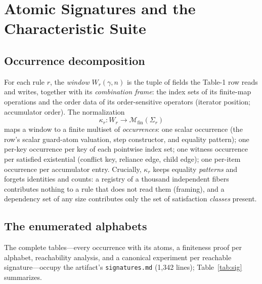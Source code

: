 \documentclass[sigplan,screen,review,nonacm]{acmart}
\newcommand{\occ}[1]{\ensuremath{\Sigma_{#1}}}
\newcommand{\kap}[1]{\ensuremath{\kappa_{#1}}}
\newcommand{\Mfin}{\ensuremath{\mathcal M_{\mathrm{fin}}}}
\begin{document}
\section{Atomic Signatures and the Characteristic Suite}\label{sec:signatures}

\subsection{Occurrence decomposition}

For each rule $r$, the \emph{window} $W_r(\gamma, n)$ is the tuple of fields
the Table-1 row reads and writes, together with its \emph{combination frame}:
the index sets of its finite-map operations and the order data of its
order-sensitive operators (iterator position; accumulator order). The
normalization
\[
\kap r : W_r \to \Mfin(\occ r)
\]
maps a window to a finite multiset of \emph{occurrences}: one scalar occurrence
(the row's scalar guard-atom valuation, step constructor, and equality
pattern); one per-key occurrence per key of each pointwise index set; one
witness occurrence per satisfied existential (conflict key, reliance edge,
child edge); one per-item occurrence per accumulator entry. Crucially,
$\kap r$ keeps equality \emph{patterns} and forgets identities and counts:
a registry of a thousand independent fibers contributes nothing to a rule that
does not read them (framing), and a dependency set of any size contributes only
the set of satisfaction \emph{classes} present.

\subsection{The enumerated alphabets}

The complete tables---every occurrence with its atoms, a finiteness proof per
alphabet, reachability analysis, and a canonical experiment per reachable
signature---occupy the artifact's \texttt{signatures.md} (1{,}342 lines);
Table~\ref{tab:sig} summarizes.
\end{document}
